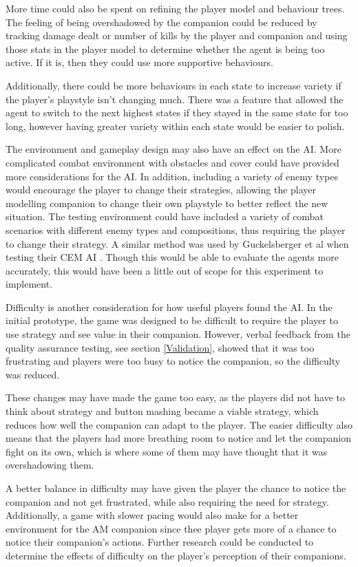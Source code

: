 \documentclass{IEEEtran}
\begin{document}
More time could also be spent on refining the player model and behaviour trees. The feeling of being overshadowed by the companion could be reduced by tracking damage dealt or number of kills by the player and companion and using those stats in the player model to determine whether the agent is being too active. If it is, then they could use more supportive behaviours.

Additionally, there could be more behaviours in each state to increase variety if the player’s playstyle isn’t changing much. There was a feature that allowed the agent to switch to the next highest states if they stayed in the same state for too long, however having greater variety within each state would be easier to polish.

The environment and gameplay design may also have an effect on the AI. More complicated combat environment with obstacles and cover could have provided more considerations for the AI. In addition, including a variety of enemy types would encourage the player to change their strategies, allowing the player modelling companion to change their own playstyle to better reflect the new situation. The testing environment could have included a variety of combat scenarios with different enemy types and compositions, thus requiring the player to change their strategy. A similar method was used by Guckelsberger et al when testing their CEM AI \cite{CoupledEmpowermentMaximisation}. Though this would be able to evaluate the agents more accurately, this would have been a little out of scope for this experiment to implement.

Difficulty is another consideration for how useful players found the AI. In the initial prototype, the game was designed to be difficult to require the player to use strategy and see value in their companion. However, verbal feedback from the quality assurance testing, see section \ref{Validation}, showed that it was too frustrating and players were too busy to notice the companion, so the difficulty was reduced.

These changes may have made the game too easy, as the players did not have to think about strategy and button mashing became a viable strategy, which reduces how well the companion can adapt to the player. The easier difficulty also means that the players had more breathing room to notice and let the companion fight on its own, which is where some of them may have thought that it was overshadowing them.

A better balance in difficulty may have given the player the chance to notice the companion and not get frustrated, while also requiring the need for strategy. Additionally, a game with slower pacing would also make for a better environment for the AM companion since thee player gets more of a chance to notice their companion’s actions. Further research could be conducted to determine the effects of difficulty on the player’s perception of their companions.
\end{document}
